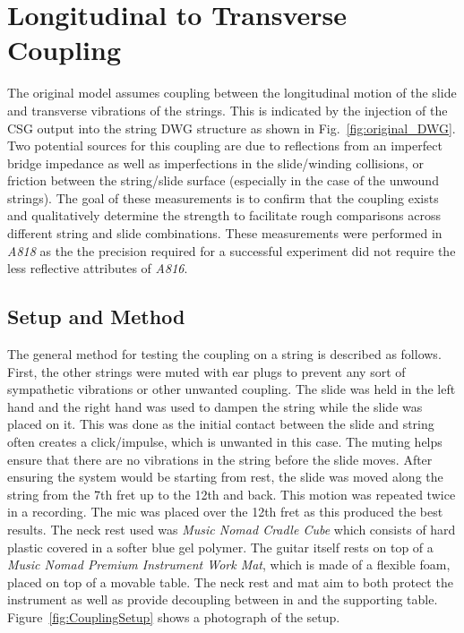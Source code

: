\documentclass[../main.tex]{subfiles}
\begin{document}
\section{Longitudinal to Transverse Coupling}
\label{sec:couplingMeasurements}
The original model assumes coupling between the longitudinal motion of the slide and transverse vibrations of the strings. This is indicated by the injection of the CSG output into the string DWG structure as shown in Fig.~\ref{fig:original_DWG}. Two potential sources for this coupling are due to reflections from an imperfect bridge impedance as well as imperfections in the slide/winding collisions, or friction between the string/slide surface (especially in the case of the unwound strings). The goal of these measurements is to confirm that the coupling exists and qualitatively determine the strength to facilitate rough comparisons across different string and slide combinations. These measurements were performed in \emph{A818} as the the precision required for a successful experiment did not require the less reflective attributes of \emph{A816}.

\subsection{Setup and Method}
\label{sec:Ch5S&M}
The general method for testing the coupling on a string is described as follows. First, the other strings were muted with ear plugs to prevent any sort of sympathetic vibrations or other unwanted coupling. The slide was held in the left hand and the right hand was used to dampen the string while the slide was placed on it. This was done as the initial contact between the slide and string often creates a click/impulse, which is unwanted in this case. The muting helps ensure that there are no vibrations in the string before the slide moves. After ensuring the system would be starting from rest, the slide was moved along the string from the 7th fret up to the 12th and back. This motion was repeated twice in a recording. The mic was placed over the 12th fret as this produced the best results. The neck rest used was \emph{Music Nomad Cradle Cube} which consists of hard plastic covered in a softer blue gel polymer. The guitar itself rests on top of a \emph{Music Nomad Premium Instrument Work Mat}, which is made of a flexible foam, placed on top of a movable table. The neck rest and mat aim to both protect the instrument as well as provide decoupling between in and the supporting table. Figure~\ref{fig:CouplingSetup} shows a photograph of the setup.
\end{document}
